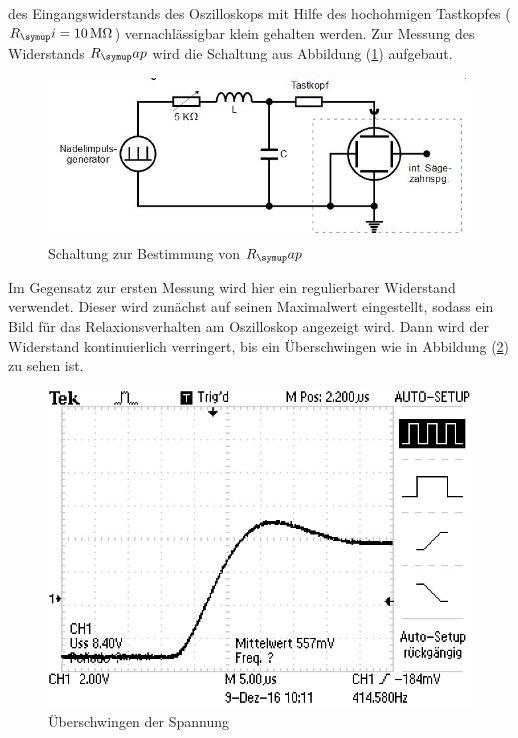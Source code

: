 des Eingangswiderstands des Oszilloskops mit Hilfe des hochohmigen Tastkopfes
($R_\su{i}=10\,\si{\mega\ohm}$) vernachlässigbar klein gehalten werden.
Zur Messung des Widerstands $R_\su{ap}$ wird die Schaltung aus Abbildung
(\ref{fig:rapschlt}) aufgebaut. \\
\begin{figure}[h]
  \centering
  \includegraphics[width=\textwidth]{Bilder/RapSchalt.JPG}
  \caption{Schaltung zur Bestimmung von $R_\su{ap}$\cite{354}}
  \label{fig:rapschlt}
\end{figure}
\newpage
Im Gegensatz zur ersten Messung wird hier ein regulierbarer Widerstand verwendet.
Dieser wird zunächst auf seinen Maximalwert eingestellt, sodass ein Bild
für das Relaxionsverhalten am Oszilloskop angezeigt wird. Dann wird der
Widerstand kontinuierlich verringert, bis ein Überschwingen wie in
Abbildung (\ref{fig:aperid}) zu sehen ist.
\begin{figure}[h]
  \centering
  \includegraphics{Bilder/aperid.JPG}
  \caption{Überschwingen der Spannung}
  \label{fig:aperid}
\end{figure} \\
